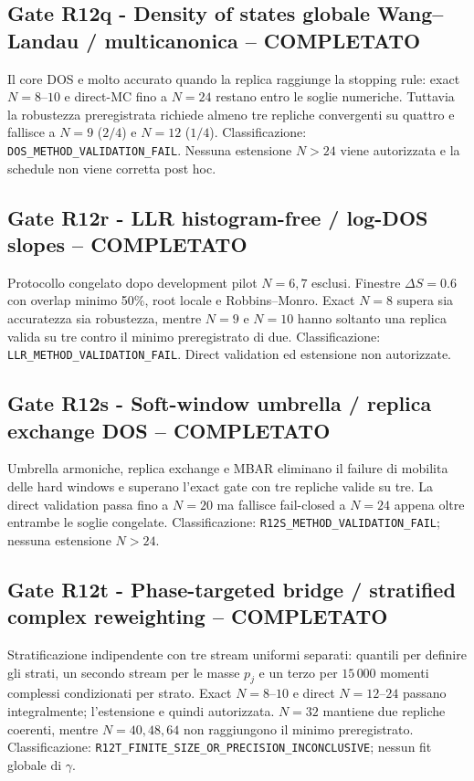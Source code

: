 \documentclass[11pt,a4paper]{article}
\begin{document}
\subsection*{Gate R12q - Density of states globale Wang--Landau / multicanonica -- COMPLETATO}
Il core DOS e molto accurato quando la replica raggiunge la stopping rule: exact $N=8$--$10$ e direct-MC fino a $N=24$ restano entro le soglie numeriche. Tuttavia la robustezza preregistrata richiede almeno tre repliche convergenti su quattro e fallisce a $N=9$ ($2/4$) e $N=12$ ($1/4$). Classificazione: \texttt{DOS\_METHOD\_VALIDATION\_FAIL}. Nessuna estensione $N>24$ viene autorizzata e la schedule non viene corretta post hoc.

\subsection*{Gate R12r - LLR histogram-free / log-DOS slopes -- COMPLETATO}
Protocollo congelato dopo development pilot $N=6,7$ esclusi. Finestre $\Delta S=0.6$ con overlap minimo 50\%, root locale e Robbins--Monro. Exact $N=8$ supera sia accuratezza sia robustezza, mentre $N=9$ e $N=10$ hanno soltanto una replica valida su tre contro il minimo preregistrato di due. Classificazione: \texttt{LLR\_METHOD\_VALIDATION\_FAIL}. Direct validation ed estensione non autorizzate.

\subsection*{Gate R12s - Soft-window umbrella / replica exchange DOS -- COMPLETATO}
Umbrella armoniche, replica exchange e MBAR eliminano il failure di mobilita delle hard windows e superano l'exact gate con tre repliche valide su tre. La direct validation passa fino a $N=20$ ma fallisce fail-closed a $N=24$ appena oltre entrambe le soglie congelate. Classificazione: \texttt{R12S\_METHOD\_VALIDATION\_FAIL}; nessuna estensione $N>24$.

\subsection*{Gate R12t - Phase-targeted bridge / stratified complex reweighting -- COMPLETATO}
Stratificazione indipendente con tre stream uniformi separati: quantili per definire gli strati, un secondo stream per le masse $p_j$ e un terzo per $15\,000$ momenti complessi condizionati per strato. Exact $N=8$--$10$ e direct $N=12$--$24$ passano integralmente; l'estensione e quindi autorizzata. $N=32$ mantiene due repliche coerenti, mentre $N=40,48,64$ non raggiungono il minimo preregistrato. Classificazione: \texttt{R12T\_FINITE\_SIZE\_OR\_PRECISION\_INCONCLUSIVE}; nessun fit globale di $\gamma$.
\end{document}
